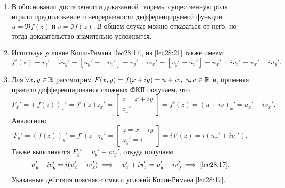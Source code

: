 \documentclass[../../main.tex]{subfiles}
\begin{document}
	
\begin{rems}

\;

\begin{enumerate}
	\item В обосновании достаточности доказанной теоремы существенную роль 
	играло предположение о непрерывности дифференцируемой функции 
	$ u = \Re f(z) $ и $ v = \Im f(z) $. В общем случае  можно отказаться 
	от него, но тогда доказательство значительно усложнится.
	\item Используя условие Коши-Римана \eqref{lec28:17}, из \eqref{lec28:21} 
	также имеем:
	\begin{equation}
	\label{lec29:22} 
	f'(z) = v_y' - iu_y' = \left[u_y' = -v_x'\right] =
	v_y' + iv_x' = \left[v_y' = u_x'\right] = u_x' + iv_x' = u_x' - iu_y'.
	\end{equation}
	\item Для $ \forall x, y \in \mathbb{R} $ рассмотрим 
	$ F(x, y) = f(x + iy) = u + iv,\ u, v \in \mathbb{R} $
	и, применяя правило дифференцирования сложных ФКП получаем, что 
	\[ 
	F_x' = (f(z))_x' = f'(z)z_x' = \left[
	\begin{gathered}
		z = x + iy\\
		z_x' = 1
	\end{gathered}
	\right] = f'(z) = (u + iv)_x' = u_x' + iv_x'.
	\]
	Аналогично
	\[ 
	F_y' = (f(z))_y' = f'(z)z_y' = \left[
	\begin{gathered}
	z = x + iy\\
	z_y' = i
	\end{gathered}
	\right] = if'(z) = i(u_x' + iv_x').\]
	Также выполняется $F_y' = u_y' + iv_y'$, откуда получаем
	\[u_y' + iv_y' = i(u_x' + iv_x') \implies -v_x' + iu_x' = u_y' + iv_y' 
	\implies \eqref{lec28:17}.\]
	Указанные действия поясняют смысл условий Коши-Римана \eqref{lec28:17}.
\end{enumerate}
\end{rems}
\end{document}
